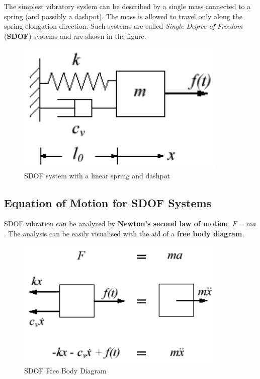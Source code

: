 \documentclass[10pt,b5paper,titlepage]{book}
\begin{document}
The simplest vibratory syslem can be described by a single mass connected to a spring
(and possibly a dashpot). The mass is allowed to travel only along the spring elongation
direction. Such systems are called \textit{Single Degree-of-Freedom} (\textbf{SDOF})
systems and are shown in the figure.

\begin{figure}[ht]
    \centering
    \includegraphics[width=0.90\textwidth]{img/SDOF_plot.png}
    \caption{SDOF system with a linear spring and dashpot}
    \label{fig:SDOF-plot-png}
\end{figure}


\subsection{Equation of Motion for SDOF Systems}

SDOF vibration can be analyzed by \textbf{Newton's second law of motion},
$ F = m a $. The analysis can be easily visualised with the aid of a
\textbf{free body diagram},

\begin{figure}[ht]
    \centering
    \includegraphics[width=0.90\textwidth]{img/SDOF_FreeBodyDiagram.png}
    \caption{SDOF Free Body Diagram}
    \label{fig:SDOF-freebodydiagram-png}
\end{figure}
\end{document}
